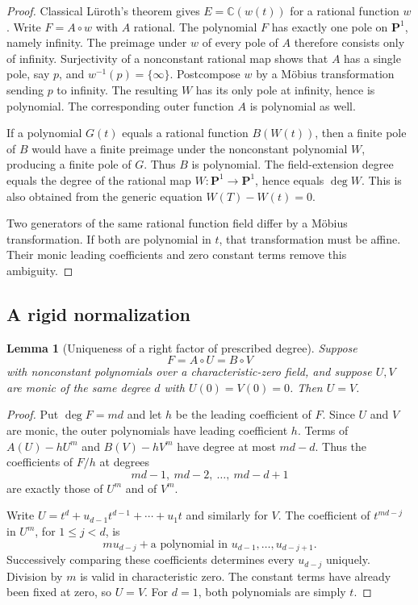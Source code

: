 \documentclass[11pt,letterpaper]{article}
\newtheorem{lemma}[theorem]{Lemma}
\theoremstyle{definition}
\theoremstyle{remark}
\newcommand{\C}{\mathbb C}
\begin{document}
\begin{proof}
Classical L\"uroth's theorem gives $E=\C(w(t))$ for a rational function $w$.
Write $F=A\circ w$ with $A$ rational. The polynomial $F$ has exactly one pole
on $\mathbf P^1$, namely infinity. The preimage under $w$ of every pole of $A$
therefore consists only of infinity. Surjectivity of a nonconstant rational map
shows that $A$ has a single pole, say $p$, and $w^{-1}(p)=\{\infty\}$.
Postcompose $w$ by a M\"obius transformation sending $p$ to infinity. The resulting
$W$ has its only pole at infinity, hence is polynomial. The corresponding outer
function $A$ is polynomial as well.

If a polynomial $G(t)$ equals a rational function $B(W(t))$, then a finite pole of
$B$ would have a finite preimage under the nonconstant polynomial $W$, producing
a finite pole of $G$. Thus $B$ is polynomial. The field-extension degree equals
the degree of the rational map $W:\mathbf P^1\to\mathbf P^1$, hence equals
$\deg W$. This is also obtained from the generic equation $W(T)-W(t)=0$.

Two generators of the same rational function field differ by a M\"obius
transformation. If both are polynomial in $t$, that transformation must be affine.
Their monic leading coefficients and zero constant terms remove this ambiguity.
\end{proof}

\subsection{A rigid normalization}

\begin{lemma}[Uniqueness of a right factor of prescribed degree]
\label{nrr:ed:lem:unique}
Suppose
\[
 F=A\circ U=B\circ V
\]
with nonconstant polynomials over a characteristic-zero field, and suppose $U,V$
are monic of the same degree $d$ with $U(0)=V(0)=0$. Then $U=V$.
\end{lemma}

\begin{proof}
Put $\deg F=md$ and let $h$ be the leading coefficient of $F$. Since $U$ and $V$
are monic, the outer polynomials have leading coefficient $h$. Terms of
$A(U)-hU^m$ and $B(V)-hV^m$ have degree at most $md-d$. Thus the coefficients
of $F/h$ at degrees
\[
 md-1,\ md-2,\ \ldots,\ md-d+1
\]
are exactly those of $U^m$ and of $V^m$.

Write $U=t^d+u_{d-1}t^{d-1}+\cdots+u_1t$ and similarly for $V$. The coefficient
of $t^{md-j}$ in $U^m$, for $1\le j<d$, is
\[
 m u_{d-j}+\text{a polynomial in }u_{d-1},\ldots,u_{d-j+1}.
\]
Successively comparing these coefficients determines every $u_{d-j}$ uniquely.
Division by $m$ is valid in characteristic zero. The constant terms have already
been fixed at zero, so $U=V$. For $d=1$, both polynomials are simply $t$.
\end{proof}
\end{document}
